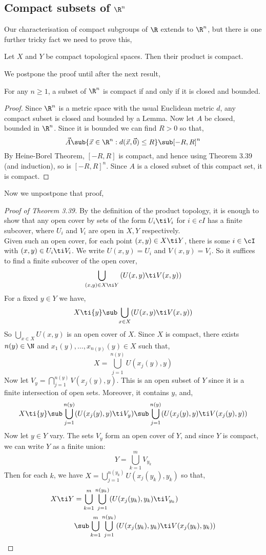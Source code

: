 \subsection{Compact subsets of $\R^n$}
Our characterisation of compact subgroups of $\R$ extends to $\R^n$, but there is one further tricky fact we need to prove this,
\begin{nthm}
  Let $X$ and $Y$ be compact topological spaces. Then their product is compact.
\end{nthm}
\noindent
We postpone the proof until after the next result,
\begin{nthm}
  For any $n \ge 1$, a subset of $\R^n$ is compact if and only if it is closed and bounded.
\end{nthm}
\begin{proof}
  Since $\R^n$ is a metric space with the usual Euclidean metric $d$, any compact subset is closed and bounded by a Lemma. Now let $A$ be closed, bounded in $\R^n$. Since it is bounded we can find $R > 0$ so that,
  $$ \vec A \sub \{\vec x \in \R^n : d(\vec x, \vec 0) \le R\} \sub [-R, R]^n $$
  By Heine-Borel Theorem, $[-R, R]$ is compact, and hence using Theorem 3.39 (and induction), so is $[-R, R]^n$. Since $A$ is a closed subset of this compact set, it is compact.
\end{proof}

\noindent
Now we unpostpone that proof,
\begin{proof}[Proof of Theorem 3.39]
  By the definition of the product topology, it is enough to show that any open cover by sets of the form $U_i \ti V_i$ for $i \in cI$ has a finite subcover, where $U_i$ and $V_i$ are open in $X, Y$ respectively.\\

  \noindent
  Given such an open cover, for each point $(x, y) \in X\ti Y$, there is some $i \in \cI$ with $(x, y) \in U_i \ti V_i$. We write $U(x, y) = U_i$ and $V(x, y) = V_i$. So it suffices to find a finite subcover of the open cover,
  $$ \bigcup_{(x, y) \in X\ti Y} \left( U(x, y) \ti V(x, y) \right) $$
  For a fixed $y \in Y$ we have,
  $$ X \ti \{y\} \sub \bigcup_{x \in X} (U(x, y) \ti V(x, y)) $$
  So $\bigcup_{x \in X} U(x, y)$ is an open cover of $X$. Since $X$ is compact, there exists $n(y) \in \N$ and $x_1(y), \dots, x_{n(y)}(y) \in X$ such that,
  $$ X = \bigcup_{j=1}^{n(y)} U(x_j(y), y) $$
  Now let $V_y = \bigcap_{j=1}^{n(y)} V(x_j(y), y)$. This is an open subset of $Y$ since it is a finite intersection of open sets. Moreover, it contains $y$, and,
  $$ X \ti \{y\} \sub \bigcup_{j=1}^{n(y)} (U(x_j(y), y) \ti V_y) \sub \bigcup_{j=1}^{n(y)} (U(x_j(y), y) \ti V(x_j(y), y)) $$
  Now let $y \in Y$ vary. The sets $V_y$ form an open cover of $Y$, and since $Y$ is compact, we can write $Y$ as a finite union:
  $$ Y = \bigcup_{k=1}^m V_{y_k} $$
  Then for each $k$, we have $X = \bigcup_{j=1}^{n(y_k)} U(x_j(y_k), y_k)$ so that,
  \begin{align*}
    X \ti Y &= \bigcup_{k=1}^m \bigcup_{j=1}^{n(y_k)} (U(x_j(y_k), y_k) \ti V_{y_k})\\
    &\sub \bigcup_{k=1}^m \bigcup_{j=1}^{n(y_k)} (U(x_j(y_k), y_k) \ti V(x_j(y_k), y_k))
  \end{align*}
\end{proof}

